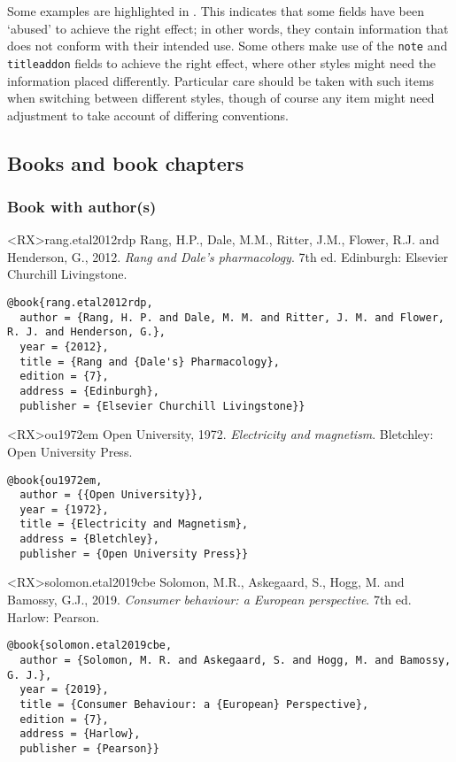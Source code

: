 \documentclass[10pt,a4paper]{article}
\begin{document}
Some examples are highlighted in
.
This indicates that some fields have been `abused' to achieve the right effect;
in other words, they contain information that does not conform with their intended use.
Some others make use of the \texttt{note} and \texttt{titleaddon} fields to achieve
the right effect, where other styles might need the information placed differently.
Particular care should be taken with such items when switching between different styles,
though of course any item might need adjustment to take account of differing conventions.

\subsection{Books and book chapters}

\subsubsection*{Book with author(s)}

\begin{bibexbox}<RX>{rang.etal2012rdp}
  Rang, H.P., Dale, M.M., Ritter, J.M., Flower, R.J. and Henderson, G., 2012. \emph{Rang and Dale's pharmacology}. 7th ed. Edinburgh: Elsevier Churchill Livingstone.
  \tcblower
\begin{Verbatim}
@book{rang.etal2012rdp,
  author = {Rang, H. P. and Dale, M. M. and Ritter, J. M. and Flower, R. J. and Henderson, G.},
  year = {2012},
  title = {Rang and {Dale's} Pharmacology},
  edition = {7},
  address = {Edinburgh},
  publisher = {Elsevier Churchill Livingstone}}
\end{Verbatim}
\end{bibexbox}

\begin{bibexbox}<RX>{ou1972em}
  Open University, 1972. \emph{Electricity and magnetism}. Bletchley: Open University Press.
  \tcblower
\begin{Verbatim}
@book{ou1972em,
  author = {{Open University}},
  year = {1972},
  title = {Electricity and Magnetism},
  address = {Bletchley},
  publisher = {Open University Press}}
\end{Verbatim}
\end{bibexbox}

\begin{bibexbox}<RX>{solomon.etal2019cbe}
  Solomon, M.R., Askegaard, S., Hogg, M. and Bamossy, G.J., 2019. \emph{Consumer behaviour: a European perspective}. 7th ed. Harlow: Pearson.
  \tcblower
\begin{Verbatim}
@book{solomon.etal2019cbe,
  author = {Solomon, M. R. and Askegaard, S. and Hogg, M. and Bamossy, G. J.},
  year = {2019},
  title = {Consumer Behaviour: a {European} Perspective},
  edition = {7},
  address = {Harlow},
  publisher = {Pearson}}
\end{Verbatim}
\end{bibexbox}
\end{document}
